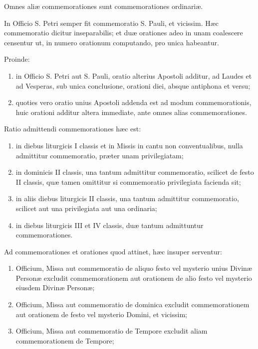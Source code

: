 \documentclass[vesperale_romanum.tex]{subfiles}
\begin{document}
Omnes aliæ commemorationes sunt commemora­tiones ordinariæ.

In Officio S. Petri semper fit commemoratio S. Pauli, et vicissim. Hæc commemoratio dicitur inseparabilis; et duæ orationes adeo in unam coalescere censentur ut, in numero orationum computando, pro unica habeantur.

Proinde:

\begin{enumerate}[nosep,label=\alph*.]
\item in Officio S. Petri aut S. Pauli, oratio alterius Apostoli additur, ad Laudes et ad Vesperas, sub unica conclusione, orationi diei, absque antiphona et versu;
\item
quoties vero oratio unius Apostoli addenda est ad modum commemorationis, huic orationi additur altera immediate, ante omnes alias commemorationes.
\end{enumerate}

Ratio admittendi commemorationes hæc est:
\begin{enumerate}[nosep,label=\alph*.]
\item 
in diebus liturgicis I classis et in Missis in cantu non conventualibus, nulla admittitur commemoratio, præter unam privilegiatam;
\item
in dominicis II classis, una tantum admittitur commemoratio, scilicet de festo II classis, quæ tamen omittitur si commemoratio privilegiata facienda sit;
\item
in aliis diebus liturgicis II classis, una tantum admittitur commemoratio, scilicet aut una privilegiata aut una ordinaria;
\item
in diebus liturgicis III et IV classis, duæ tantum admittuntur commemorationes.
\end{enumerate}

Ad commemorationes et orationes quod attinet, hæc insuper serventur:
\begin{enumerate}[nosep,label=\alph*.]
\item Officium, Missa aut commemoratio de aliquo festo vel mysterio unius Divinæ Personæ excludit commemorationem aut orationem de alio festo vel mysterio eiusdem Divinæ Personæ;
\item
Officium, Missa aut commemoratio de dominica excludit commemorationem aut orationem de festo vel mysterio Domini, et vicissim;
\item
Officium, Missa aut commemoratio de Tempore excludit aliam commemorationem de Tempore;
\end{enumerate}
\end{document}
